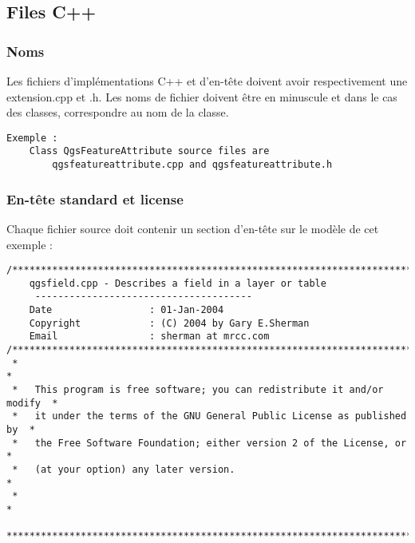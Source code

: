\subsection{Files C++}
\subsubsection{Noms}
Les fichiers d'implémentations C++ et d'en-tête doivent avoir respectivement une extension.cpp et .h. Les noms de fichier doivent être en minuscule et dans le cas des classes, correspondre au nom de la classe.

\begin{verbatim}
Exemple :
	Class QgsFeatureAttribute source files are 
		qgsfeatureattribute.cpp and qgsfeatureattribute.h
\end{verbatim}

\subsubsection{En-tête standard et license}
Chaque fichier source doit contenir un section d'en-tête sur le modèle de cet exemple :

\begin{verbatim}
/***************************************************************************
    qgsfield.cpp - Describes a field in a layer or table
     --------------------------------------
    Date                 : 01-Jan-2004
    Copyright            : (C) 2004 by Gary E.Sherman
    Email                : sherman at mrcc.com
/***************************************************************************
 *                                                                         *
 *   This program is free software; you can redistribute it and/or modify  *
 *   it under the terms of the GNU General Public License as published by  *
 *   the Free Software Foundation; either version 2 of the License, or     *
 *   (at your option) any later version.                                   *
 *                                                                         *
 ***************************************************************************/
\end{verbatim}

